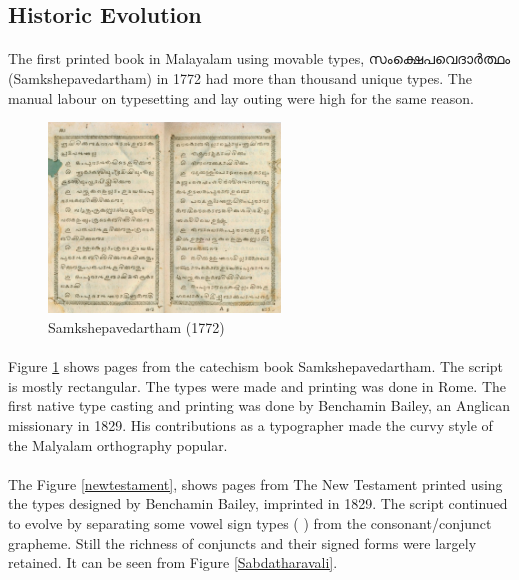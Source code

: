\documentclass[10pt]{article}
\begin{document}
\subsection{Historic Evolution}

\paragraph{}
The first printed book in Malayalam using movable types, \begingroup \manjari സംക്ഷെപവെദാർത്ഥം \endgroup (Samkshepavedartham) in 1772 had more than thousand unique types. \cite{babucherian} The manual labour on typesetting and lay outing were high for the same reason. 

\begin{figure}
  \centering
   \includegraphics[width=0.55\textwidth]{images/samkshepavedartham1772.png}
     \caption{Samkshepavedartham (1772)}
	\label{Samkshepam}
\end{figure}

\paragraph{}
Figure \ref{Samkshepam} shows pages from the catechism book  Samkshepavedartham.  The script is mostly rectangular. The types were made and printing was done in Rome. The first native type casting and printing was done by Benchamin Bailey, an Anglican missionary in 1829.   His contributions as a typographer made the curvy style of the  Malyalam orthography popular.\cite{gupthannair} 


\paragraph{}
The Figure \ref{newtestament}, shows pages from The New Testament printed using the types designed by Benchamin Bailey, imprinted in 1829.\cite{babucherian} The script continued to evolve by separating some vowel sign types (\begingroup {} \endgroup) from the consonant/conjunct grapheme. Still the richness of conjuncts and their signed forms were largely retained. It can be seen from Figure \ref{Sabdatharavali}. 
\end{document}
